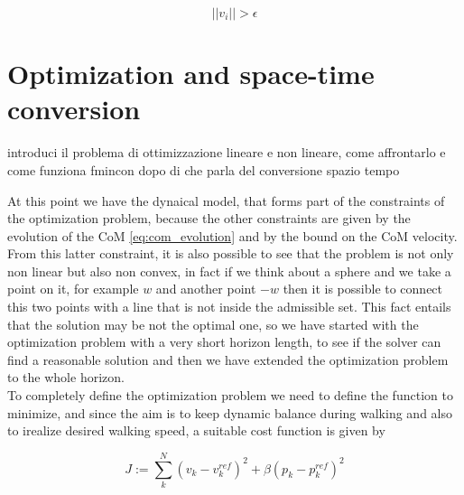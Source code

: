 \documentclass[a4paper]{article}
\begin{document}
\begin{equation}
||v_i||>\epsilon
\label{eq:vel_const}
\end{equation}

\section{Optimization and space-time conversion}
introduci il problema di ottimizzazione lineare e non lineare, come affrontarlo e come funziona fmincon dopo di che parla del conversione spazio tempo

At this point we have the dynaical model, that forms part of the constraints of the optimization problem, because the other constraints are given by the evolution of the CoM \ref{eq:com_evolution} and by the bound on the CoM velocity. From this latter constraint, it is also possible to see that the problem is not only non linear but also non convex, in fact if we think about a sphere and we take a point on it, for example $w$ and another point $-w$ then it is possible to connect this two points with a line that is not inside the admissible set. This fact entails that the solution may be not the optimal one, so we have started with the optimization problem with a very short horizon length, to see if the solver can find a reasonable solution and then we have extended the optimization problem to the whole horizon.\\
To completely define the optimization problem we need to define the function to minimize, and since the aim is to keep dynamic balance during walking and also to irealize desired walking speed, a suitable cost function is given by 


\begin{equation}
J := \sum_k^N{(v_k-v_k^{ref})^2+\beta(p_k-p_k^{ref})^2}
\label{eq:cost_function}
\end{equation}  
\end{document}
